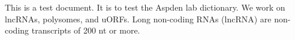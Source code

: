 \documentclass{article}
\begin{document}
This is a test document.
It is to test the Aspden lab dictionary.
We work on lncRNAs, polysomes, and uORFs.
Long non-coding RNAs (lncRNA) are non-coding transcripts of 200 nt or more.
\end{document}
